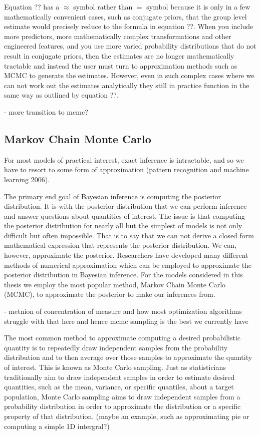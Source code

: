 Equation ?? has a $\approx$ symbol rather than $=$ symbol because it is only in a few mathematically convenient cases, such as conjugate priors, that the group level estimate would precisely reduce to the formula in equation ??. When you include more predictors, more mathematically complex transformations and other engineered features, and you use more varied probability distributions that do not result in conjugate priors, then the estimates are no longer mathematically tractable and instead the user must turn to approximation methods such as MCMC to generate the estimates. However, even in such complex cases where we can not work out the estimates analytically they still in practice function in the same way as outlined by equation ??.

- more transition to mcmc?

\subsection{Markov Chain Monte Carlo}

For most models of practical interest, exact inference is intractable, and so we have to resort to some form of approximation (pattern recognition and machine learning 2006).

The primary end goal of Bayesian inference is computing the posterior distribution. It is with the posterior distribution that we can perform inference and answer questions about quantities of interest. The issue is that computing the posterior distribution for nearly all but the simplest of models is not only difficult but often impossible. That is to say that we can not derive a closed form mathematical expression that represents the posterior distribution. We can, however, approximate the posterior. Researchers have developed many different methods of numerical approximation which can be employed to approximate the posterior distribution in Bayesian inference. For the models considered in this thesis we employ the most popular method, Markov Chain Monte Carlo (MCMC), to approximate the posterior to make our inferences from.

- metnion of concentration of measure and how most optimization algorithms struggle with that here and hence mcmc sampling is the best we currently have

The most common method to approximate computing a desired probabilistic quantity is to repeatedly draw independent samples from the probability distribution and to then average over those samples to approximate the quantity of interest. This is known as Monte Carlo sampling.  Just as statisticians traditionally aim to draw independent samples in order to estimate desired quantities, such as the mean, variance, or specific quantiles, about a target population, Monte Carlo sampling aims to draw independent samples from a probability distribution in order to approximate the distribution or a specific property of that distribution. (maybe an example, such as approximating pie or computing a simple 1D intergral?)


